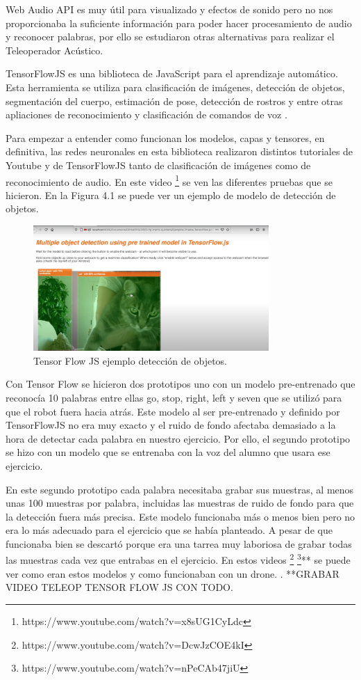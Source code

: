 Web Audio API es muy útil para visualizado y efectos de sonido pero no nos proporcionaba la suficiente información para poder hacer procesamiento de audio y reconocer palabras, por ello se estudiaron otras alternativas para realizar el Teleoperador Acústico. 

TensorFlowJS es una biblioteca de JavaScript para el aprendizaje automático. Esta herramienta se utiliza para clasificación de imágenes, detección de objetos, segmentación del cuerpo, estimación de pose, detección de rostros y entre otras apliaciones de reconocimiento y clasificación de comandos de voz \cite{tensorflowmodel}.

Para empezar a entender como funcionan los modelos, capas y  tensores, en definitiva,  las redes neuronales en esta biblioteca realizaron distintos tutoriales de Youtube y de TensorFlowJS tanto de clasificación de imágenes como de reconocimiento de audio. En este video \footnote{https://www.youtube.com/watch?v=x8sUG1CyLdc} se ven las diferentes pruebas que se hicieron. En la Figura 4.1 se puede ver un ejemplo de modelo de detección de objetos.

\begin{figure}[H]
    \centering
    \includegraphics[width=0.8\textwidth, height=0.4\textwidth]{chapters/images/imagerecognition.png}
    \caption{Tensor Flow JS ejemplo detección de objetos. }
    \label{fig:my_label}
\end{figure}

Con Tensor Flow se hicieron dos prototipos uno con un modelo pre-entrenado que reconocía 10 palabras entre ellas go, stop, right, left  y seven que se utilizó para que el robot fuera hacia atrás.
Este modelo al ser pre-entrenado y definido por TensorFlowJS no era muy exacto y el ruido de fondo afectaba demasiado a la hora de detectar cada palabra en nuestro ejercicio. Por ello, el segundo prototipo se hizo con un modelo que se entrenaba con la voz del alumno que usara ese ejercicio.

En este segundo prototipo cada palabra necesitaba grabar sus muestras, al menos unas 100 muestras por palabra, incluidas las muestras de ruido de fondo para que la detección fuera más precisa. Este modelo funcionaba más o menos bien pero no era lo más adecuado para el ejercicio que se había planteado. A pesar de que funcionaba bien se descartó porque era una tarrea muy laboriosa de grabar todas las muestras cada vez que entrabas en el ejercicio. 
En estos videos \footnote{https://www.youtube.com/watch?v=DcwJzCOE4kI}
\footnote{https://www.youtube.com/watch?v=nPeCAb47jiU}** se puede ver  como eran estos modelos y como funcionaban con un drone.
.  **GRABAR VIDEO TELEOP TENSOR FLOW JS CON TODO.

